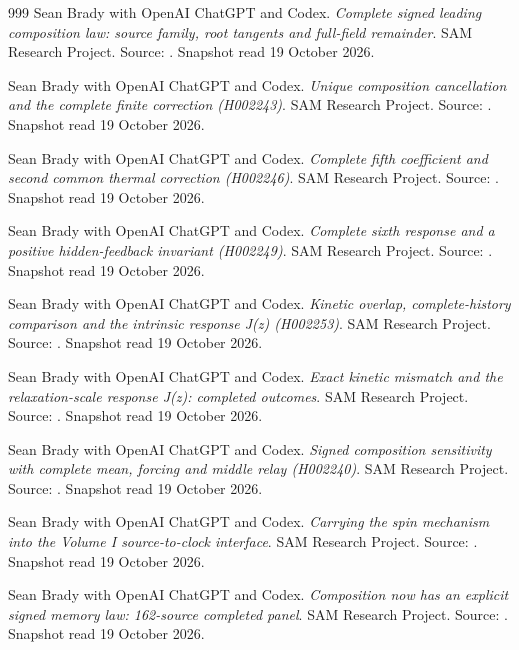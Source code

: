 \begin{thebibliography}{999}
 Sean Brady with OpenAI ChatGPT and Codex. \emph{Complete signed leading composition law: source family, root tangents and full-field remainder}. SAM Research Project. Source: . Snapshot read 19 October 2026.

 Sean Brady with OpenAI ChatGPT and Codex. \emph{Unique composition cancellation and the complete finite correction (H002243)}. SAM Research Project. Source: . Snapshot read 19 October 2026.

 Sean Brady with OpenAI ChatGPT and Codex. \emph{Complete fifth coefficient and second common thermal correction (H002246)}. SAM Research Project. Source: . Snapshot read 19 October 2026.

 Sean Brady with OpenAI ChatGPT and Codex. \emph{Complete sixth response and a positive hidden-feedback invariant (H002249)}. SAM Research Project. Source: . Snapshot read 19 October 2026.

 Sean Brady with OpenAI ChatGPT and Codex. \emph{Kinetic overlap, complete-history comparison and the intrinsic response J(z) (H002253)}. SAM Research Project. Source: . Snapshot read 19 October 2026.

 Sean Brady with OpenAI ChatGPT and Codex. \emph{Exact kinetic mismatch and the relaxation-scale response J(z): completed outcomes}. SAM Research Project. Source: . Snapshot read 19 October 2026.

 Sean Brady with OpenAI ChatGPT and Codex. \emph{Signed composition sensitivity with complete mean, forcing and middle relay (H002240)}. SAM Research Project. Source: . Snapshot read 19 October 2026.

 Sean Brady with OpenAI ChatGPT and Codex. \emph{Carrying the spin mechanism into the Volume I source-to-clock interface}. SAM Research Project. Source: . Snapshot read 19 October 2026.

 Sean Brady with OpenAI ChatGPT and Codex. \emph{Composition now has an explicit signed memory law: 162-source completed panel}. SAM Research Project. Source: . Snapshot read 19 October 2026.


\end{thebibliography}
